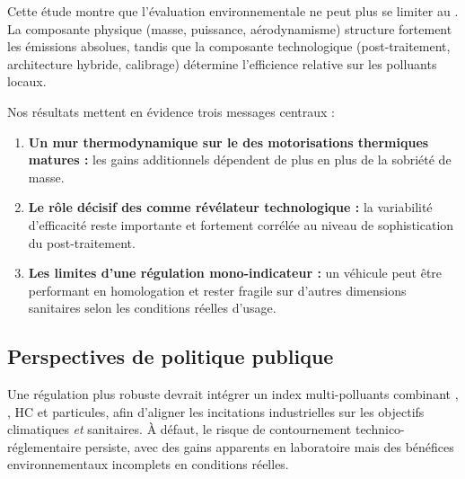 \documentclass[12pt, a4paper]{article}
\begin{document}
Cette étude montre que l'évaluation environnementale ne peut plus se limiter au . La composante physique (masse, puissance, aérodynamisme) structure fortement les émissions absolues, tandis que la composante technologique (post-traitement, architecture hybride, calibrage) détermine l'efficience relative sur les polluants locaux.

Nos résultats mettent en évidence trois messages centraux :
\begin{enumerate}
    \item \textbf{Un mur thermodynamique sur le  des motorisations thermiques matures :} les gains additionnels dépendent de plus en plus de la sobriété de masse.
    \item \textbf{Le rôle décisif des  comme révélateur technologique :} la variabilité d'efficacité reste importante et fortement corrélée au niveau de sophistication du post-traitement.
    \item \textbf{Les limites d'une régulation mono-indicateur :} un véhicule peut être performant en homologation  et rester fragile sur d'autres dimensions sanitaires selon les conditions réelles d'usage.
\end{enumerate}

\subsection{Perspectives de politique publique}

Une régulation plus robuste devrait intégrer un index multi-polluants combinant , , HC et particules, afin d'aligner les incitations industrielles sur les objectifs climatiques \textit{et} sanitaires. À défaut, le risque de contournement technico-réglementaire persiste, avec des gains apparents en laboratoire mais des bénéfices environnementaux incomplets en conditions réelles.

\fi
\end{document}
